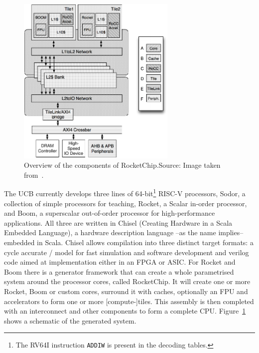 \documentclass[journal,a4paper]{IEEEtran}
\newcommand{\source}[1]{Source: #1}
\begin{document}
\begin{figure}[!t]
	\centering
	\includegraphics[width=3in]{rcov}
	\caption{Overview of the components of RocketChip.\newline\hspace{\linewidth}\source{Image taken from~\cite{rocket}}.}
	\label{rcov}
\end{figure}
The UCB currently develops three lines of 64-bit\footnote{The RV64I instruction \texttt{ADDIW}\cite[p.28]{riscv} is present in the decoding tables\cite{code-tables}.}  RISC-V processors, Sodor\cite{sodor}, a collection of simple processors for teaching, Rocket\cite[p.4]{rocket}, a Scalar in-order processor, and Boom\cite{boom}, a superscalar out-of-order processor for high-performance applications.
All three are written in Chisel (Creating Hardware in a Scala Embedded Language), a hardware description language --as the name implies-- embedded in Scala.
Chisel allows compilation into three distinct target formats: a cycle accurate \CC/ model for fast simulation and software development and verilog code aimed at implementation either in an FPGA or ASIC\@.
For Rocket and Boom there is a generator framework that can create a whole parametrised system around the processor cores, called RocketChip\cite{rocket}.
It will create one or more Rocket, Boom or custom cores, surround it with caches, optionally an FPU and accelerators to form one or more [compute-]tiles.
This assembly is then completed with an interconnect and other components to form a complete CPU.
%
Figure~\ref{rcov} shows a schematic of the generated system.
\end{document}
